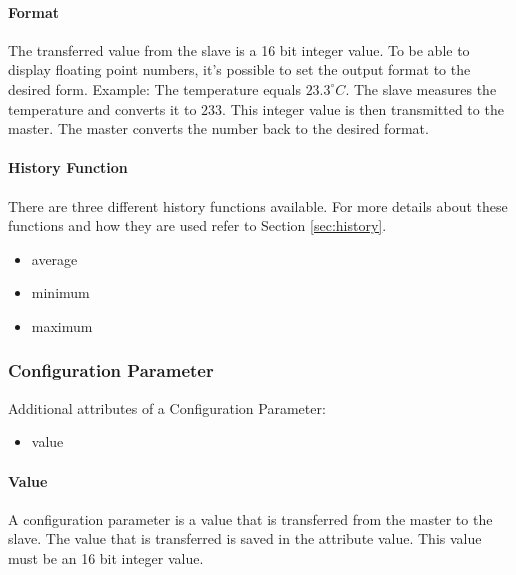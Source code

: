 
\paragraph{Format} %
\label{par:format}
The transferred value from the slave is a 16 bit integer value. To be able to display floating point numbers, it's possible to set the output format to the desired form. Example: The temperature equals $23.3 ^\circ C$. The slave measures the temperature and converts it to $233$. This integer value is then transmitted to the master. The master converts the number back to the desired format. 

\paragraph{History Function} %
\label{par:histfunc}
There are three different history functions available. For more details about these functions and how they are used refer to Section \ref{sec:history}.
\label{par:history_function}
\begin{itemize}
    \item average
    \item minimum
    \item maximum
\end{itemize}

\subsubsection{Configuration Parameter} %
\label{ssub:configuration_parameter}
Additional attributes of a Configuration Parameter:
\begin{itemize}
    \item value
\end{itemize}

\paragraph{Value} %
\label{par:value}
A configuration parameter is a value that is transferred from the master to the slave. The value that is transferred is saved in the attribute value. This value must be an 16 bit integer value.


